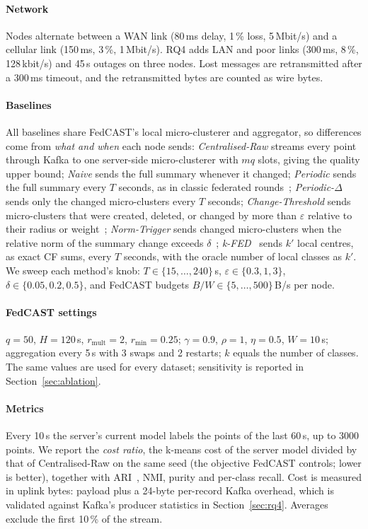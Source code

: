 \paragraph{Network} Nodes alternate between a WAN link (80\,ms delay, 1\,\% loss, 5\,Mbit/s) and a cellular link (150\,ms, 3\,\%, 1\,Mbit/s). RQ4 adds LAN and poor links (300\,ms, 8\,\%, 128\,kbit/s) and 45\,s outages on three nodes. Lost messages are retransmitted after a 300\,ms timeout, and the retransmitted bytes are counted as wire bytes.

\paragraph{Baselines} All baselines share FedCAST's local micro-clusterer and aggregator, so differences come from \emph{what and when} each node sends:
\emph{Centralised-Raw} streams every point through Kafka to one server-side micro-clusterer with $mq$ slots, giving the quality upper bound;
\emph{Naive} sends the full summary whenever it changed;
\emph{Periodic} sends the full summary every $T$ seconds, as in classic federated rounds~\cite{mcmahan2017fedavg};
\emph{Periodic-$\Delta$} sends only the changed micro-clusters every $T$ seconds;
\emph{Change-Threshold} sends micro-clusters that were created, deleted, or changed by more than $\varepsilon$ relative to their radius or weight~\cite{tran2013communication,gama2011dgclust};
\emph{Norm-Trigger} sends changed micro-clusters when the relative norm of the summary change exceeds $\delta$~\cite{ghosh2021eventgrad};
\emph{k-FED}~\cite{dennis2021kfed} sends $k'$ local centres, as exact CF sums, every $T$ seconds, with the oracle number of local classes as $k'$.
We sweep each method's knob: $T\in\{15,\dots,240\}$\,s, $\varepsilon\in\{0.3,1,3\}$, $\delta\in\{0.05,0.2,0.5\}$, and FedCAST budgets $B/W\in\{5,\dots,500\}$\,B/s per node.

\paragraph{FedCAST settings} $q{=}50$, $H{=}120$\,s, $r_\text{mult}{=}2$, $r_\text{min}{=}0.25$; $\gamma{=}0.9$, $\rho{=}1$, $\eta{=}0.5$, $W{=}10$\,s; aggregation every 5\,s with 3 swaps and 2 restarts; $k$ equals the number of classes. The same values are used for every dataset; sensitivity is reported in Section~\ref{sec:ablation}.

\paragraph{Metrics} Every 10\,s the server's current model labels the points of the last 60\,s, up to 3000 points. We report the \emph{cost ratio}, the k-means cost of the server model divided by that of Centralised-Raw on the same seed (the objective FedCAST controls; lower is better), together with ARI~\cite{hubert1985ari}, NMI, purity and per-class recall. Cost is measured in uplink bytes: payload plus a 24-byte per-record Kafka overhead, which is validated against Kafka's producer statistics in Section~\ref{sec:rq4}. Averages exclude the first 10\,\% of the stream.

